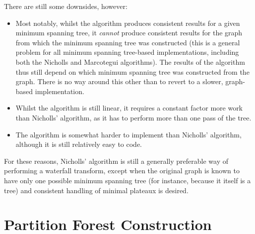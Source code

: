 \newpage

\noindent There are still some downsides, however:
%
\begin{itemize}
\item Most notably, whilst the algorithm produces consistent results for a given minimum spanning tree, it \emph{cannot} produce consistent results for the graph from which the minimum spanning tree was constructed (this is a general problem for all minimum spanning tree-based implementations, including both the Nicholls and Marcotegui algorithms). The results of the algorithm thus still depend on which minimum spanning tree was constructed from the graph. There is no way around this other than to revert to a slower, graph-based implementation.
\item Whilst the algorithm is still linear, it requires a constant factor more work than Nicholls' algorithm, as it has to perform more than one pass of the tree.
\item The algorithm is somewhat harder to implement than Nicholls' algorithm, although it is still relatively easy to code.
\end{itemize}
%
For these reasons, Nicholls' algorithm is still a generally preferable way of performing a waterfall transform, except when the original graph is known to have only one possible minimum spanning tree (for instance, because it itself is a tree) and consistent handling of minimal plateaux is desired.

\iffalse
# Based on Chris's work
+ Produces results that do not depend on the implementation of key data structures (like Marcotegui's) or where the MST is rooted (like Chris's)
+ Efficient, linear-time algorithm
+ Useful as a first step in other waterfall algorithms, because it carefully pins down the types of different edges
+ Easy to implement
- Produces results that depend on which MST is constructed (all MST-based algorithms, including Chris's, necessarily do this -- the only alternative is to run the waterfall on a graph and accept that it will be slower)
- Requires a constant factor more work than Chris's
- Not as easy to implement as Chris's
- The 'incorrect' version of Chris's actually produces better results than either this one or Chris's 'correct' version(!)
\fi

\section{Partition Forest Construction}

